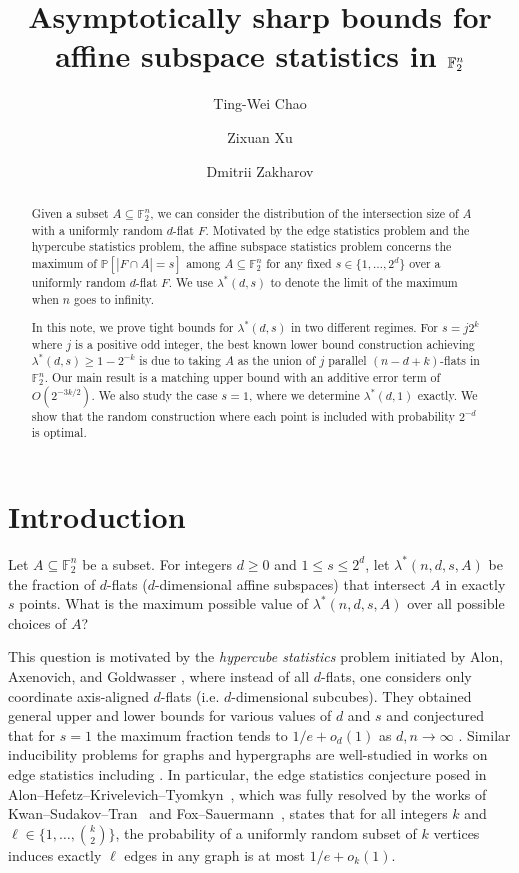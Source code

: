 \documentclass[reqno]{amsart}
\title{Asymptotically sharp bounds for affine subspace statistics in $\F_2^n$}
\author[T.-W. Chao]{Ting-Wei Chao\thankssymb{1}}
\author[Z. Xu]{Zixuan Xu\thankssymb{1}}
\author[D. Zakharov]{Dmitrii Zakharov\thankssymb{1}}
\theoremstyle{definition}
\theoremstyle{remark}
\newcommand{\F}{\mathbb F}
\begin{document}
\begin{abstract}
Given a subset $A \subseteq \F_2^n$, we can consider the distribution of the intersection size of $A$ with a uniformly random $d$-flat $F$. Motivated by the edge statistics problem and the hypercube statistics problem, the affine subspace statistics problem concerns the maximum of $\mathbb{P}[|F\cap A|=s]$ among $A \subseteq \F_2^n$ for any fixed $s\in\{1,\dots,2^d\}$ over a uniformly random $d$-flat $F$. We use $\lambda^*(d,s)$ to denote the limit of the maximum when $n$ goes to infinity.


In this note, we prove tight bounds for $\lambda^*(d,s)$ in two different regimes.
For $s=j2^k$ where $j$ is a positive odd integer, the best known lower bound construction achieving $\lambda^*(d,s)\ge 1-2^{-k}$ is due to taking $A$ as the union of $j$ parallel $(n-d+k)$-flats in $\F_2^n$. Our main result is a matching upper bound with an additive error term of $O(2^{-3k/2})$.
We also study the case $s=1$, where we determine $\lambda^*(d,1)$ exactly. We show that the random construction where each point is included with probability $2^{-d}$ is optimal.
\end{abstract}

\maketitle

\section{Introduction}

Let $A\subseteq \F_2^n$ be a subset. For integers $d\geq 0$ and $1\leq s\leq 2^d$, let $\lambda^*(n,d,s,A)$ be the fraction of $d$-flats ($d$-dimensional affine subspaces) that intersect $A$ in exactly $s$ points. What is the maximum possible value of $\lambda^*(n,d,s,A)$ over all possible choices of $A$?

This question is motivated by the {\em hypercube statistics} problem initiated by Alon, Axenovich, and
Goldwasser \cite{AlonAxenovichGoldwasser2024}, where instead of all $d$-flats, one considers only coordinate axis-aligned $d$-flats (i.e. $d$-dimensional subcubes). They obtained general upper and lower bounds for various values of $d$ and $s$ and conjectured that for $s=1$ the maximum fraction tends to $1/e+o_d(1)$ as $d,n \to \infty$ . Similar inducibility problems for graphs and hypergraphs are well-studied in works on edge statistics including \cite{AlonHefetzKrivelevichTyomkyn2020,KwanSudakovTran2019,MartinssonMoussetNoeverTrujic2019,FoxSauermann2020,JainKwanMubayiTran2025,GrebennikovKwan2025}.
In particular, the edge statistics conjecture posed in Alon--Hefetz--Krivelevich--Tyomkyn~\cite{AlonHefetzKrivelevichTyomkyn2020}, which was fully resolved by the works of Kwan--Sudakov--Tran~\cite{KwanSudakovTran2019} and Fox--Sauermann~\cite{FoxSauermann2020}, states that for all integers $k$ and $\ell \in \{1, \dots, {k\choose 2}\}$, the probability of a uniformly random subset of $k$ vertices induces exactly $\ell$ edges in any graph is at most $1/e+o_k(1)$. 
\end{document}

